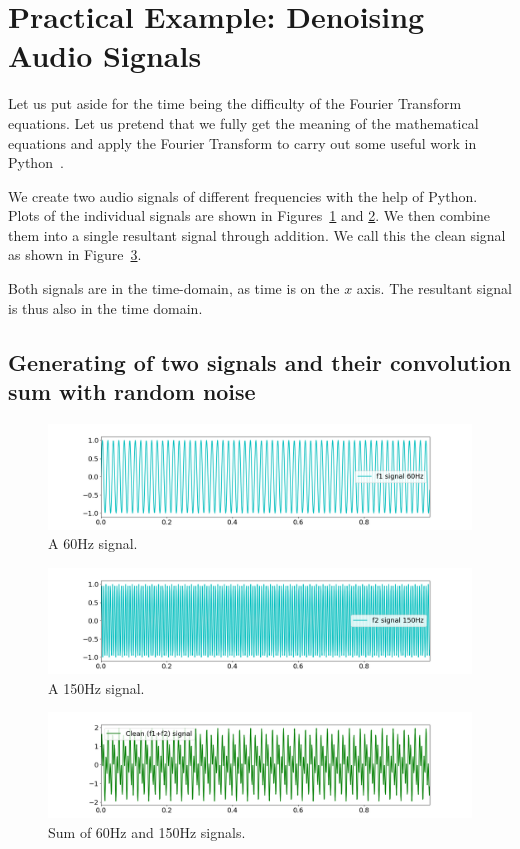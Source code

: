 \documentclass[a4paper, 12pt]{scrartcl}
\begin{document}
\section{Practical Example: Denoising Audio Signals}
Let us put aside for the time being the difficulty of the Fourier Transform equations.
Let us pretend that we fully get the meaning of the mathematical equations and apply the Fourier Transform to carry out some useful work in Python~\cite{CleanUpNoise}.

We create two audio signals of different frequencies with the help of Python.
Plots of the individual signals are shown in Figures~\ref{fig:sixty} and \ref{fig:onefifty}.
We then combine them into a single resultant signal through addition.
We call this the clean signal as shown in Figure~\ref{fig:sumsignals}.

Both signals are in the time-domain, as time is on the $x$ axis.
The resultant signal is thus also in the time domain.
\subsection{Generating of two signals and their convolution sum with random noise}
\begin{figure}[H] 
  \centering
  \includegraphics[width=\textwidth]{img/signal_60hz.png}
  \caption{A 60Hz signal.}
  \label{fig:sixty}
\end{figure}

\begin{figure}[H] 
  \centering
  \includegraphics[width=\textwidth]{img/signal_150hz.png}
  \caption{A 150Hz signal.}
  \label{fig:onefifty}
\end{figure}

\begin{figure}[H] 
  \centering
  \includegraphics[width=\textwidth]{img/sum_signals.png}
  \caption{Sum of 60Hz and 150Hz signals.}
  \label{fig:sumsignals}
\end{figure}
\end{document}
